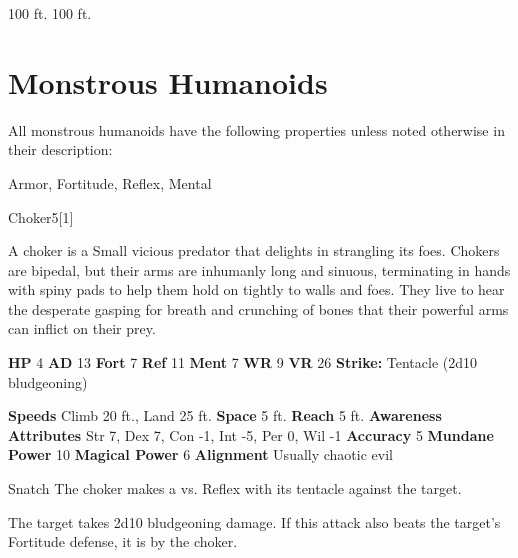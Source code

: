      
       100 ft.
     100 ft.
  
        \newpage
        \section{Monstrous Humanoids}

        All monstrous humanoids have the following properties unless noted otherwise in their description:
        
    
     Armor,
     Fortitude,
     Reflex,
     Mental
  
  
      
  \begin{monsection}{Choker}{5}[1]
    \vspace{-1em}\vspace{-1em}
    \vspace{0em}

    
        A choker is a Small vicious predator that delights in strangling its foes.
        Chokers are bipedal, but their arms are inhumanly long and sinuous, terminating in hands with spiny pads to help them hold on tightly to walls and foes.
        They live to hear the desperate gasping for breath and crunching of bones that their powerful arms can inflict on their prey.
      

    \begin{spellcontent}
      \begin{spelltargetinginfo}
        \pari \textbf{HP} 4 \monsep
          \textbf{AD} 13 \monsep
          \textbf{Fort} 7 \monsep
          \textbf{Ref} 11 \monsep
          \textbf{Ment} 7
        \pari \textbf{WR} 9 \monsep
        \textbf{VR} 26
        \pari \textbf{Strike:}
            Tentacle  (2d10 bludgeoning)
      \end{spelltargetinginfo}
    \end{spellcontent}
    \begin{monsterfooter}
      \pari \textbf{Speeds} Climb 20 ft., Land 25 ft. \monsep
        \textbf{Space} 5 ft. \monsep
        \textbf{Reach} 5 ft.
      \pari \textbf{Awareness} 
      \pari \textbf{Attributes}
        Str 7, Dex 7,
        Con -1, Int -5,
        Per 0, Wil -1
      \pari \textbf{Accuracy} 5 \monsep
        \textbf{Mundane Power} 10 \monsep
      \textbf{Magical Power} 6
      \pari \textbf{Alignment} Usually chaotic evil
    \end{monsterfooter}
  \end{monsection}
  \begin{freeability}{Snatch}
       The choker makes a 
         vs. Reflex
        with its tentacle against the target.
    
    \hit 
          The target takes 2d10 bludgeoning damage.
          If this attack also beats the target's Fortitude defense, it is  by the choker.
    \end{freeability}
  

